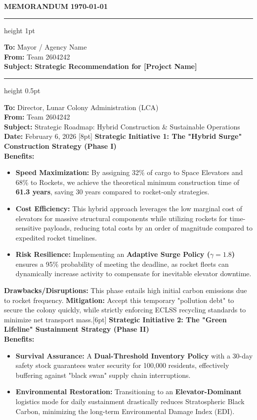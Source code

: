 \documentclass[11pt,letterpaper]{article}
\newcommand{\teamno}{2604242}
\newenvironment{memosheet}{%
    \clearpage
    \newgeometry{top=2cm, bottom=2cm, left=2.5cm, right=2.5cm} %
    \thispagestyle{empty}
    \begingroup
    \sffamily
    \noindent
    {\huge\bfseries\color{black!80} MEMORANDUM} \hfill \textbf{\today}
    \par\vspace{10pt}
    \hrule height 1pt
    \par\vspace{10pt}
    \begin{tabbing}
        \textbf{To:} \hspace{1cm} \= Mayor / Agency Name \\
        \textbf{From:} \> Team \teamno \\
        \textbf{Subject:} \> \textbf{Strategic Recommendation for [Project Name]}
    \end{tabbing}
    \par\vspace{5pt}
    \hrule height 0.5pt
    \par\vspace{15pt}
    \setlength{\parskip}{0.8em}
}{%
    \endgroup
    \restoregeometry
}
\begin{document}
\begin{memosheet}
\noindent\textbf{To:} Director, Lunar Colony Administration (LCA) \\
\textbf{From:} Team \teamno \\
\textbf{Subject:} Strategic Roadmap: Hybrid Construction \& Sustainable Operations \\
\textbf{Date:} February 6, 2026 [8pt]
\textbf{Strategic Initiative 1: The "Hybrid Surge" Construction Strategy (Phase I)}\\
\textbf{Benefits:}
\begin{itemize}
    \item \textbf{Speed Maximization:} By assigning 32\% of cargo to Space Elevators and 68\% to Rockets, we achieve the theoretical minimum construction time of \textbf{61.3 years}, saving 30 years compared to rocket-only strategies.
    \item \textbf{Cost Efficiency:} This hybrid approach leverages the low marginal cost of elevators for massive structural components while utilizing rockets for time-sensitive payloads, reducing total costs by an order of magnitude compared to expedited rocket timelines.
    \item \textbf{Risk Resilience:} Implementing an \textbf{Adaptive Surge Policy ($\gamma=1.8$)} ensures a 95\% probability of meeting the deadline, as rocket fleets can dynamically increase activity to compensate for inevitable elevator downtime.
\end{itemize}
\textbf{Drawbacks/Disruptions:} This phase entails high initial carbon emissions due to rocket frequency. \textbf{Mitigation:} Accept this temporary "pollution debt" to secure the colony quickly, while strictly enforcing ECLSS recycling standards to minimize net transport mass.[6pt]
\textbf{Strategic Initiative 2: The "Green Lifeline" Sustainment Strategy (Phase II)}\\
\textbf{Benefits:}
\begin{itemize}
    \item \textbf{Survival Assurance:} A \textbf{Dual-Threshold Inventory Policy} with a 30-day safety stock guarantees water security for 100,000 residents, effectively buffering against "black swan" supply chain interruptions.
    \item \textbf{Environmental Restoration:} Transitioning to an \textbf{Elevator-Dominant} logistics mode for daily sustainment drastically reduces Stratospheric Black Carbon, minimizing the long-term Environmental Damage Index (EDI).

\end{itemize}
\end{memosheet}
\end{document}
